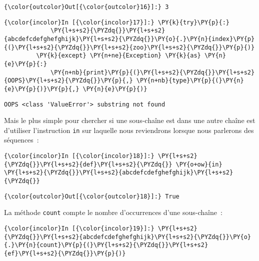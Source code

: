 \begin{Verbatim}[commandchars=\\\{\}]
{\color{outcolor}Out[{\color{outcolor}16}]:} 3
\end{Verbatim}
            
    \begin{Verbatim}[commandchars=\\\{\}]
{\color{incolor}In [{\color{incolor}17}]:} \PY{k}{try}\PY{p}{:}
             \PY{l+s+s2}{\PYZdq{}}\PY{l+s+s2}{abcdefcdefghefghijk}\PY{l+s+s2}{\PYZdq{}}\PY{o}{.}\PY{n}{index}\PY{p}{(}\PY{l+s+s2}{\PYZdq{}}\PY{l+s+s2}{zoo}\PY{l+s+s2}{\PYZdq{}}\PY{p}{)}
         \PY{k}{except} \PY{n+ne}{Exception} \PY{k}{as} \PY{n}{e}\PY{p}{:}
             \PY{n+nb}{print}\PY{p}{(}\PY{l+s+s2}{\PYZdq{}}\PY{l+s+s2}{OOPS}\PY{l+s+s2}{\PYZdq{}}\PY{p}{,} \PY{n+nb}{type}\PY{p}{(}\PY{n}{e}\PY{p}{)}\PY{p}{,} \PY{n}{e}\PY{p}{)}
\end{Verbatim}


    \begin{Verbatim}[commandchars=\\\{\}]
OOPS <class 'ValueError'> substring not found

    \end{Verbatim}

    Mais le plus simple pour chercher si une sous-chaîne est dans une autre
chaîne est d'utiliser l'instruction \texttt{in} sur laquelle nous
reviendrons lorsque nous parlerons des séquences~:

    \begin{Verbatim}[commandchars=\\\{\}]
{\color{incolor}In [{\color{incolor}18}]:} \PY{l+s+s2}{\PYZdq{}}\PY{l+s+s2}{def}\PY{l+s+s2}{\PYZdq{}} \PY{o+ow}{in} \PY{l+s+s2}{\PYZdq{}}\PY{l+s+s2}{abcdefcdefghefghijk}\PY{l+s+s2}{\PYZdq{}}
\end{Verbatim}


\begin{Verbatim}[commandchars=\\\{\}]
{\color{outcolor}Out[{\color{outcolor}18}]:} True
\end{Verbatim}
            
    La méthode \texttt{count} compte le nombre d'occurrences d'une
sous-chaîne~:

    \begin{Verbatim}[commandchars=\\\{\}]
{\color{incolor}In [{\color{incolor}19}]:} \PY{l+s+s2}{\PYZdq{}}\PY{l+s+s2}{abcdefcdefghefghijk}\PY{l+s+s2}{\PYZdq{}}\PY{o}{.}\PY{n}{count}\PY{p}{(}\PY{l+s+s2}{\PYZdq{}}\PY{l+s+s2}{ef}\PY{l+s+s2}{\PYZdq{}}\PY{p}{)}
\end{Verbatim}


